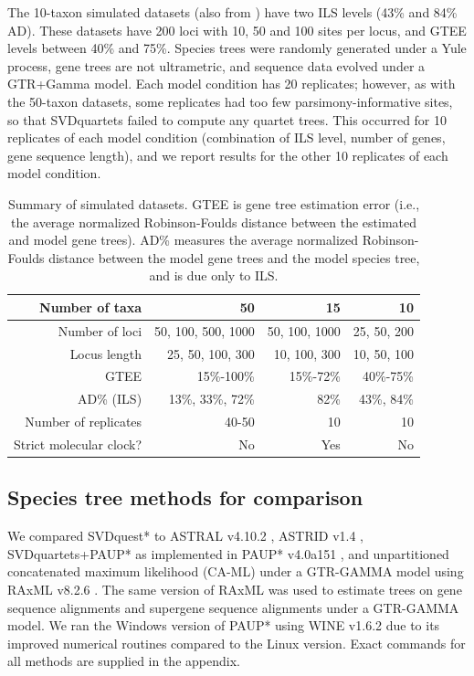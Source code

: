 The 10-taxon simulated datasets (also from \cite{bayzid2015weighted})
have two ILS levels (43\% and 84\% AD). %
These datasets have 200 loci with 10, 50 and 100 sites per
locus, and GTEE levels between 40\% and 75\%.
Species trees were randomly generated under a Yule process,
gene trees are not ultrametric, and sequence data evolved under a
GTR+Gamma model. 
Each model condition has 20 replicates; however, as with the 50-taxon datasets, some replicates had  too few parsimony-informative sites, so that SVDquartets failed to compute any
quartet trees. This occurred for 10 replicates of each model condition (combination of ILS level, number of genes, gene sequence length), and we
report results for the other 10 replicates of each model condition.



\begin{table}
  \centering
  \begin{tabular}{|r|r|r|r|}
    \hline
    Number of  taxa&50&15&10\\
    \hline
    Number of loci&50, 100, 500, 1000 & 50, 100, 1000& 25, 50, 200 \\   
    Locus length & 25, 50, 100, 300 & 10, 100, 300 & 10, 50, 100\\   
    GTEE &15\%-100\% & 15\%-72\% & 40\%-75\% \\    \hline
   AD\% (ILS) & 13\%, 33\%, 72\% & 82\% & 43\%, 84\% \\    \hline
  Number of replicates & 40-50 & 10 & 10 \\    \hline
    Strict molecular clock? & No & Yes & No \\
    \hline
  \end{tabular}
  \caption[Summary of simulated datasets for SVDquest study]{Summary of simulated datasets. GTEE is gene tree estimation
    error (i.e.,  the 
   average normalized Robinson-Foulds distance between the 
     estimated and model gene
    trees).  AD\% measures the average normalized Robinson-Foulds distance 
    between
    the model gene trees and the model species tree, and is due only to 
    ILS.  }\label{svdquest::sim_summary}
\end{table}

\subsection{Species tree methods for comparison}

We compared SVDquest* to ASTRAL v4.10.2 \cite{mirarab2015astral},
ASTRID v1.4 \cite{vachaspati2015astrid}, SVDquartets+PAUP* as implemented in
PAUP* v4.0a151 \cite{paup}, and unpartitioned concatenated maximum
likelihood (CA-ML) under a GTR-GAMMA model using RAxML v8.2.6
\cite{Stamatakis2006}. The same version of RAxML was used to estimate trees on gene sequence alignments and supergene sequence alignments
under a GTR-GAMMA model. 
We ran the Windows version of PAUP* using WINE v1.6.2 due to its improved
numerical routines compared to the Linux version. 
Exact commands for all methods are
supplied in the appendix.

